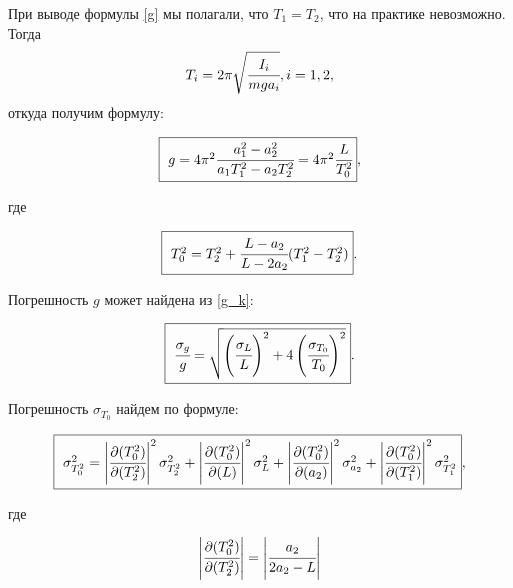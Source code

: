 \documentclass[a4paper,12pt]{article}
\begin{document}
При выводе формулы \eqref{g} мы полагали, что $T_1=T_2$, что на практике невозможно. Тогда
$$
T_i=2\pi \sqrt{\cfrac{I_i}{mga_i}}, i = 1, 2,
$$
откуда получим формулу:
\begin{center}
	\vspace{-20pt}
	\begin{equation}
	\fbox{
	$g = 4 \pi^2 \cfrac{a_1^2-a_2^2}{a_1 T_1^2-a_2 T_2^2} = 4 \pi^2 \cfrac{L}{T_0^2}$},
	\label{g_k}
	\end{equation}
	\vspace{-20pt}
\end{center}
где
\begin{center}
	\vspace{-20pt}
	\begin{equation}
	\fbox{
	$T_0^2=T_2^2+\cfrac{L-a_2}{L-2a_2}(T_1^2-T_2^2)$}.
	\label{T_0}
	\end{equation}
	\vspace{-20pt}
\end{center}
Погрешность $g$ может найдена из \eqref{g_k}:
\begin{center}
	\vspace{-20pt}
	\begin{equation}
	\fbox{
	$\cfrac{\sigma_g}{g} = \sqrt{\left(\cfrac{\sigma_L}{L}\right)^2 + 4 \left(\cfrac{\sigma_{T_0}}{T_0} \right)^2}$}.
	\label{error_g}
	\end{equation}
	\vspace{-20pt}
\end{center}
Погрешность $\sigma_{T_0}$ найдем по формуле:
\begin{center}
	\vspace{-20pt}
	\begin{equation}
	\fbox{
	$\sigma_{T_0^2}^2=\left| \cfrac{\partial(T_0^2)}{\partial(T_2^2)} \right|^2 \sigma_{T_2^2}^2+\left| \cfrac{\partial(T_0^2)}{\partial(L)} \right|^2 \sigma_{L}^2+\left| \cfrac{\partial(T_0^2)}{\partial(a_2)} \right|^2 \sigma_{a_2}^2+\left| \cfrac{\partial(T_0^2)}{\partial(T_1^2)} \right|^2 \sigma_{T_1^2}^2$},
	\label{error_T_0}
	\end{equation}
	\vspace{-20pt}
\end{center}
где
\begin{center}
	\vspace{-20pt}
	\begin{equation}
	\left| \cfrac{\partial(T_0^2)}{\partial(T_2^2)} \right|=\left|\cfrac{a_2}{2a_2-L}\right|
	\label{10}
	\end{equation}
	\vspace{-20pt}
\end{center}
\end{document}
